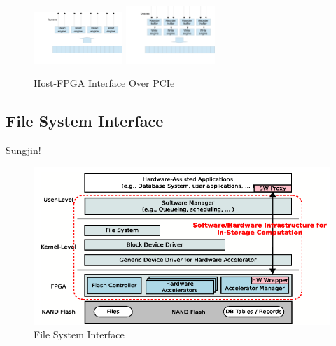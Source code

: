 \begin{figure}[ht!]
	\begin{center}
	\includegraphics[width=0.3\textwidth]{figures/readinterface-crop.pdf}
	\includegraphics[width=0.3\textwidth]{figures/writeinterface-crop.pdf}
	\caption{Host-FPGA Interface Over PCIe}
	\label{fig:hostinterface}
	\end{center}
\end{figure}


\subsection{File System Interface}

Sungjin!

\begin{figure}[h]
	\begin{center}
	\includegraphics[width=0.4\paperwidth]{figures/swstack.png}
	\caption{File System Interface}
	\label{fig:filesystem}
	\end{center}
\end{figure}
